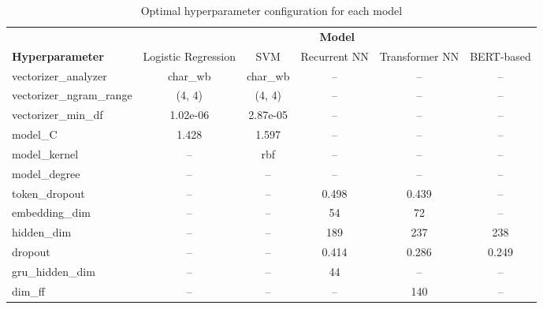 \begin{table}[!ht]
\centering
\small

\begin{tabular}{m{3.2cm}ccccc}
\toprule
& \multicolumn{5}{c}{\textbf{Model}} \\
 \cmidrule(lr){2-6} 
\textbf{Hyperparameter} & Logistic Regression & SVM & Recurrent NN & Transformer NN & BERT-based \\
\midrule

vectorizer\_analyzer & char\_wb & char\_wb & -- & -- & -- \\
vectorizer\_ngram\_range & (4, 4) & (4, 4) & -- & -- & -- \\
vectorizer\_min\_df & 1.02e-06 & 2.87e-05 & -- & -- & -- \\
model\_C & 1.428 & 1.597 & -- & -- & -- \\
model\_kernel & -- & rbf & -- & -- & -- \\
model\_degree & -- & -- & -- & -- & -- \\
\midrule
token\_dropout & -- & -- & 0.498 & 0.439 & -- \\
embedding\_dim & -- & -- & 54 & 72 & -- \\
hidden\_dim & -- & -- & 189 & 237 & 238 \\
dropout & -- & -- & 0.414 & 0.286 & 0.249 \\
gru\_hidden\_dim & -- & -- & 44 & -- & -- \\
dim\_ff & -- & -- & -- & 140 & -- \\

\bottomrule
\end{tabular}
\caption{Optimal hyperparameter configuration for each model}
\label{table-optimal-hparams}
\end{table}